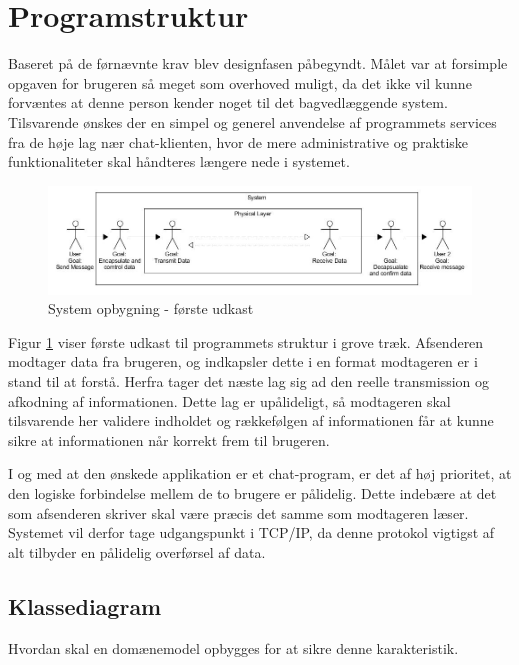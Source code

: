 

\section{Programstruktur}
Baseret på de førnævnte krav blev designfasen påbegyndt. Målet var at forsimple opgaven for brugeren så meget som overhoved muligt, da det ikke vil kunne forvæntes at denne person kender noget til det bagvedlæggende system. 
Tilsvarende ønskes der en simpel og generel anvendelse af programmets services fra de høje lag nær chat-klienten, hvor de mere administrative og praktiske funktionaliteter skal håndteres længere nede i systemet.

\begin{figure}[h!]
\centering
\includegraphics[scale=0.5]{Billeder/ProgramOpbygning1.JPG}
\caption{System opbygning - første udkast}
\label{fig:Blokdiagram}
\end{figure}

Figur \ref{fig:Blokdiagram} viser første udkast til programmets struktur i grove træk. Afsenderen modtager data fra brugeren, og indkapsler dette i en format modtageren er i stand til at forstå. Herfra tager det næste lag sig ad den reelle transmission og afkodning af informationen. Dette lag er upålideligt, så modtageren skal tilsvarende her validere indholdet og rækkefølgen af informationen får at kunne sikre at informationen når korrekt frem til brugeren. 

I og med at den ønskede applikation er et chat-program, er det af høj prioritet, at den logiske forbindelse mellem de to brugere er pålidelig. Dette indebære at det som afsenderen skriver skal være præcis det samme som modtageren læser. Systemet vil derfor tage udgangspunkt i TCP/IP, da denne protokol vigtigst af alt tilbyder en pålidelig overførsel af data. 




\subsection{Klassediagram}
Hvordan skal en domænemodel opbygges for at sikre denne karakteristik. 

